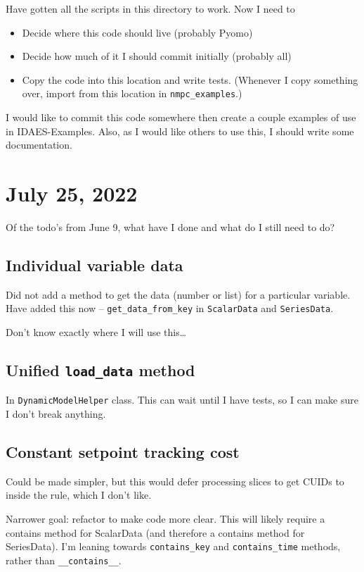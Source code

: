 \documentclass{article}
\begin{document}
Have gotten all the scripts in this directory to work.
Now I need to
\begin{itemize}
  \item Decide where this code should live (probably Pyomo)
  \item Decide how much of it I should commit initially (probably all)
  \item Copy the code into this location and write tests.
    (Whenever I copy something over, import from this location in
    \texttt{nmpc\_examples}.)
\end{itemize}
I would like to commit this code somewhere then create a couple examples of use
in IDAES-Examples. Also, as I would like others to use this, I should write
some documentation.

\section{July 25, 2022}
Of the todo's from June 9, what have I done and what do I still need to do?

\subsection{Individual variable data}
Did not add a method to get the data (number or list) for a particular
variable. Have added this now -- \texttt{get\_data\_from\_key}
in \texttt{ScalarData} and \texttt{SeriesData}.

Don't know exactly where I will use this\ldots

\subsection{Unified \texttt{load\_data} method}
In \texttt{DynamicModelHelper} class. This can wait until I have tests,
so I can make sure I don't break anything.

\subsection{Constant setpoint tracking cost}
Could be made simpler, but this would defer processing slices to
get CUIDs to inside the rule, which I don't like.

Narrower goal: refactor to make code more clear.
This will likely require a contains method for ScalarData
(and therefore a contains method for SeriesData).
I'm leaning towards \texttt{contains\_key}
and \texttt{contains\_time} methods, rather than
\texttt{\_\_contains\_\_}.
\end{document}
